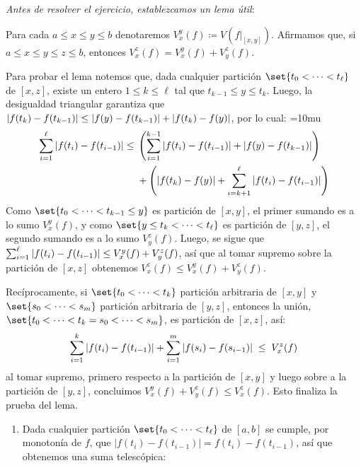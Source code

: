 \clearpage
\begin{sol}
\emph{Antes de resolver el ejercicio, establezcamos un lema útil}:
\begin{tcolorbox}[colback=white, boxrule=0.5pt, fontupper=\small,arc=0.5mm]
\begin{lema}[Aditividad]\label{lema:ad}
Para cada $a\le x\le y\le b$ denotaremos $V^y_x(f) \coloneq V(f|_{[x,y]})$. Afirmamos que, si $a\le x\le y\le z\le  b$, entonces $V^z_x(f) = V^y_x(f) + V^z_y(f)$.
\end{lema}
\end{tcolorbox}
Para probar el lema notemos que, dada cualquier partición $\set{t_0<\cdots< t_\ell}$ de $[x,z]$, existe un entero $1\le k \le \ell$ tal que $t_{k-1} \le y \le t_k$. Luego, la desigualdad triangular garantiza que $|f(t_k)-f(t_{k-1})| \leq \abs{f(y)-f(t_{k-1})} + \abs{f(t_k)-f(y)}$, por lo cual:  
{\thickmuskip=10mu
\begin{align*}
\sum^\ell_{i=1}\abs{f(t_i)-f(t_{i-1})}
\leq{}&\left(\sum^{k-1}_{i=1}\abs{f(t_i)-f(t_{i-1})} + \abs{f(y)-f(t_{k-1})}\right)\\ 
&+ \left(\abs{f(t_k)-f(y)} + \sum^\ell_{i=k+1}\abs{f(t_i)-f(t_{i-1})}\right)
\end{align*}
}%
Como $\set{t_0<\cdots<t_{k-1} \le y}$ es partición de $[x,y]$, el primer sumando es a lo sumo $V^y_x(f)$, y como $\set{y\le t_{k}<\cdots<t_\ell}$ es partición de $[y,z]$, el segundo sumando es a lo sumo $V^z_y(f)$. Luego, se sigue que $\sum^\ell_{i=1}\abs{f(t_i)-f(t_{i-1})} \leq V^y_x(f) + V^z_y(f)$, así que al tomar supremo sobre la partición de $[x,z]$ obtenemos $V^z_x(f) \leq V^y_x(f) + V^z_y(f)$.\par
Recíprocamente, si $\set{t_0<\cdots<t_k}$ partición arbitraria de $[x,y]$ y $\set{s_0 < \cdots< s_m}$ partición arbitraria de $[y,z]$, entonces la unión, $\set{t_0<\cdots<t_k = s_0 < \cdots< s_m}$, es partición de $[x,z]$, así:
\[
\sum^k_{i=1}\abs{f(t_i)-f(t_{i-1})} + \sum^m_{i=1}\abs{f(s_i)-f(s_{i-1})} \;\le\; V^z_x(f)
\]
al tomar supremo, primero respecto a la partición de $[x,y]$ y luego sobre a la partición de $[y,z]$, concluimos $V^y_x(f) + V^z_y(f) \leq V^z_x(f)$. Esto finaliza la prueba del lema.
\begin{enumerate}[label=(\roman*),leftmargin=1.8em]
\item %
Dada cualquier partición $\set{t_0<\cdots<t_\ell}$ de $[a,b]$ se cumple, por monotonía de $f$, que $|f(t_i) - f(t_{i-1})| = f(t_i) - f(t_{i-1})$, así que obtenemos una suma telescópica:

\end{enumerate}
\end{sol}
